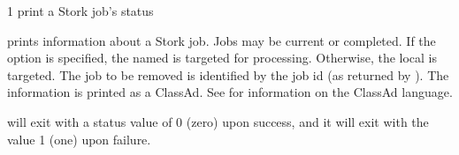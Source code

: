 \begin{ManPage}{\label{man-stork-status}}{1}
{print a Stork job's status}

\Synopsis {}
\ToolArgsBase

\Storkname
{}


\Description 

 prints information about a Stork job.  
Jobs may be current or completed.
If the  option is specified,
the named  is targeted for processing.
Otherwise, the local  is targeted.
The job to be removed is identified by the job id 
(as returned by ).
The information is printed as a ClassAd.
See  for information
on the ClassAd language.

\begin{Options}
	\ToolArgsBaseDesc
	\StorknameDesc
\end{Options}

\ExitStatus

 will exit with a status value of 0 (zero) upon success,
and it will exit with the value 1 (one) upon failure.

\end{ManPage}
